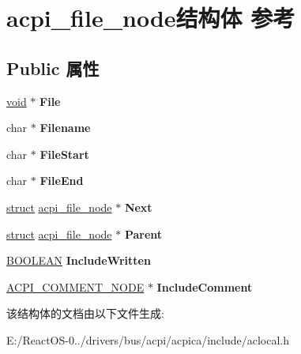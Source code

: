 \hypertarget{structacpi__file__node}{}\section{acpi\+\_\+file\+\_\+node结构体 参考}
\label{structacpi__file__node}
\subsection*{Public 属性}
\begin{DoxyCompactItemize}
\item 
\mbox{\label{structacpi__file__node_a682b944c7561a06b26e7d66075f93e14}} 
\hyperlink{interfacevoid}{void} $\ast$ {\bfseries File}
\item 
\mbox{\label{structacpi__file__node_a6cf8d466d3d4cf9783cfb55cfefa2c39}} 
char $\ast$ {\bfseries Filename}
\item 
\mbox{\label{structacpi__file__node_aeb8eee6ecd0e1c4c91acc1f106f21f7d}} 
char $\ast$ {\bfseries File\+Start}
\item 
\mbox{\label{structacpi__file__node_a11b391ac27c0c0f98d556c7ca580bbcd}} 
char $\ast$ {\bfseries File\+End}
\item 
\mbox{\label{structacpi__file__node_a63158ae87c9bc6bcfbc632cb18d08fe8}} 
\hyperlink{interfacestruct}{struct} \hyperlink{structacpi__file__node}{acpi\+\_\+file\+\_\+node} $\ast$ {\bfseries Next}
\item 
\mbox{\label{structacpi__file__node_a11a6d92b0f65b0f324b8cd0b16991189}} 
\hyperlink{interfacestruct}{struct} \hyperlink{structacpi__file__node}{acpi\+\_\+file\+\_\+node} $\ast$ {\bfseries Parent}
\item 
\mbox{\label{structacpi__file__node_aa0af6e5eb0699e3e76168f213c9fd08e}} 
\hyperlink{_processor_bind_8h_a112e3146cb38b6ee95e64d85842e380a}{B\+O\+O\+L\+E\+AN} {\bfseries Include\+Written}
\item 
\mbox{\label{structacpi__file__node_afd76609dff57d65f58f1517e8cb8bb7e}} 
\hyperlink{structacpi__comment__node}{A\+C\+P\+I\+\_\+\+C\+O\+M\+M\+E\+N\+T\+\_\+\+N\+O\+DE} $\ast$ {\bfseries Include\+Comment}
\end{DoxyCompactItemize}


该结构体的文档由以下文件生成\+:\begin{DoxyCompactItemize}
\item 
E\+:/\+React\+O\+S-\/0../drivers/bus/acpi/acpica/include/aclocal.\+h\end{DoxyCompactItemize}
